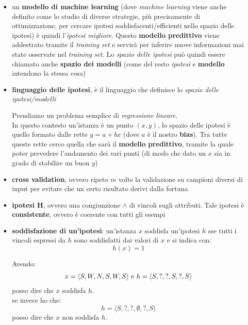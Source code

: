 \documentclass[a4paper,12pt, oneside]{book}
\begin{document}
\begin{shaded}
\begin{itemize}
    \item un \textbf{modello di machine learning} (dove \textit{machine
      learning} viene anche definito come lo studio di diverse strategie, più
    precisamente di ottimizzazione, per
    cercare ipotesi soddisfacenti/efficienti nello spazio delle ipotesi) è
    quindi l'\textit{ipotesi migliore}. Questo \textbf{modello predittivo} viene
    addestrato tramite il \textit{training set} e servirà per inferire nuove
    informazioni mai state osservate nel \textit{training set}. Lo
    \textit{spazio delle ipotesi} può quindi essere chiamato anche
    \textbf{spazio dei modelli} (come del resto \textit{ipotesi} e
    \textbf{modello} intendono la stessa cosa)
    \item \textbf{linguaggio delle ipotesi}, è il linguaggio che definisce lo
    \textit{spazio delle ipotesi/modelli}
    \begin{esempio}
      Prendiamo un problema semplice di \textit{regressione lineare}.\\
      In questo contesto un'istanza è un punto $(x,y)$, lo spazio delle ipotesi
      è quello formato dalle rette $y=a+bx$ (dove $a$ è il nostro
      \textbf{bias}). Tra tutte queste rette cerco quella che sarà il
      \textbf{modello predittivo}, tramite la quale poter prevedere l'andamento
      dei vari punti (di modo che dato un $x$ sia in grado di stabilire un buon
      $y$)
    \end{esempio}
    
    \item \textbf{cross validation}, ovvero ripeto $m$ volte la validazione su
    campioni diversi di input per evitare che un certo risultato derivi dalla
    fortuna 
    \item \textbf{ipotesi H}, ovvero una congiunzione $\land$ di vincoli sugli
    attributi. Tale ipotesi è \textbf{consistente}, ovvero è coerente con tutti
    gli esempi
    \item \textbf{soddisfazione di un'ipotesi}: un'istanza $x$ soddisfa
    un'ipotesi $h$ sse tutti i vincoli espressi da $h$ sono soddisfatti dai
    valori di $x$ e si indica con:
    \[h(x)=1\]
    \begin{esempio}
      Avendo:
      \[x=\langle S,W,N,S,W,S\rangle \mbox{ \textnormal{e}
        }h=\langle S,?,?,S,?,S\rangle\]
      posso dire che $x$ soddisfa $h$.\\
      se invece ho che:
      \[h=\langle S,?,?,\emptyset,?,S\rangle\]
      posso dire che $x$ non soddisfa $h$.
    \end{esempio}
  \end{itemize}
\end{shaded}
\end{document}
